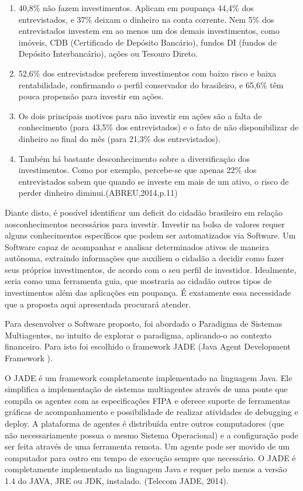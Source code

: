 \begin{citacao}
\begin{enumerate}
\item 40,8\% não fazem investimentos. Aplicam em poupança 44,4\% dos entrevistados, e 37\% deixam o dinheiro na conta corrente. Nem 5\% dos entrevistados investem em ao menos um dos demais investimentos, como imóveis, CDB (Certificado de Depósito Bancário), fundos DI (fundos de Depósito Interbancário), ações ou Tesouro Direto.
\item 52,6\% 	dos entrevistados preferem investimentos com baixo risco e baixa rentabilidade, confirmando o perfil conservador do brasileiro, e 65,6\% têm pouca propensão para investir em ações.
\item Os dois principais motivos para não investir em ações são a falta de conhecimento (para 43,5\% dos entrevistados) e o fato de não disponibilizar de dinheiro ao final do mês (para 21,3\% dos entrevistados).
\item Também há bastante desconhecimento sobre a diversificação dos investimentos. Como por exemplo, percebe-se que apenas 22\% dos entrevistados sabem que quando se investe em mais de um ativo, o risco de perder dinheiro diminui.(ABREU,2014,p.11)

\end{enumerate}
\end{citacao}

Diante disto, é possível identificar um deficit do cidadão brasileiro em relação aosconhecimentos necessários para investir. Investir na bolsa de valores requer alguns conhecimentos específicos que podem ser automatizados via Software. Um Software capaz de acompanhar e analisar determinados ativos de maneira autônoma, extraindo informações que auxiliem o cidadão a decidir como fazer seus próprios investimentos, de acordo com o seu perfil de investidor. Idealmente, seria como uma ferramenta guia, que mostraria ao cidadão outros tipos de investimentos além das aplicações em poupança. É exatamente essa necessidade que a proposta aqui apresentada procurará atender.

Para desenvolver o Software proposto, foi abordado o Paradigma de Sistemas Multiagentes, no intuito de explorar o paradigma, aplicando-o ao contexto financeiro. Para isto foi escolhido o framework JADE  (Java Agent Development Framework ).

\begin{citacao}
O JADE é um framework completamente implementado na linguagem Java. Ele simplifica a implementação de sistemas multiagentes através de uma ponte que compila os agentes com as especificações FIPA e oferece suporte de ferramentas gráficas de acompanhamento e possibilidade de realizar atividades de debugging e deploy.  A plataforma de agentes é distribuída entre outros computadores (que não necessariamente possua o mesmo Sistema Operacional) e a configuração pode ser feita através de uma ferramenta remota. Um agente pode ser movido de um computador para outro em tempo de execução sempre que necessário. O JADE é completamente implementado na linguagem Java e requer pelo menos a versão 1.4 do JAVA, JRE ou  JDK, instalado. (Telecom JADE, 2014).
\end{citacao}

